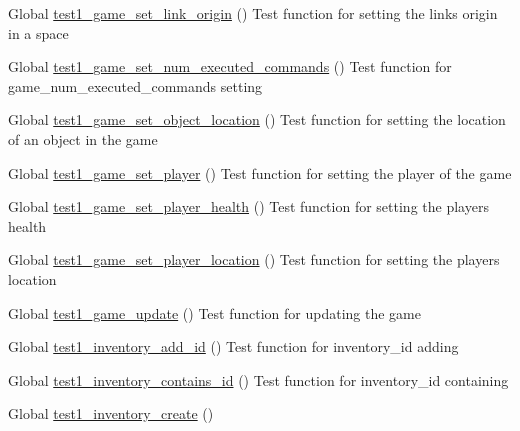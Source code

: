 \begin{DoxyRefList}
\item[Global \mbox{\hyperlink{game__test_8c_a87a7d534c6ea81e0db3296f678fe770a}{test1\+\_\+game\+\_\+set\+\_\+link\+\_\+origin}} ()]\label{test__test000243}%
%
Test function for setting the link\textquotesingle{}s origin in a space  
\item[Global \mbox{\hyperlink{game__test_8c_a130b1332ea3733268fb6ae18bdcbc5ac}{test1\+\_\+game\+\_\+set\+\_\+num\+\_\+executed\+\_\+commands}} ()]\label{test__test000276}%
%
Test function for game\+\_\+num\+\_\+executed\+\_\+commands setting  
\item[Global \mbox{\hyperlink{game__test_8c_a467fe2bad25b7d53fa51ad3901f4672f}{test1\+\_\+game\+\_\+set\+\_\+object\+\_\+location}} ()]\label{test__test000206}%
%
Test function for setting the location of an object in the game  
\item[Global \mbox{\hyperlink{game__test_8c_a2bc38fca795c42215043a239f722309a}{test1\+\_\+game\+\_\+set\+\_\+player}} ()]\label{test__test000153}%
%
Test function for setting the player of the game  
\item[Global \mbox{\hyperlink{game__test_8c_a03692a2a855f9e6fc5da753f525affd0}{test1\+\_\+game\+\_\+set\+\_\+player\+\_\+health}} ()]\label{test__test000167}%
%
Test function for setting the player\textquotesingle{}s health  
\item[Global \mbox{\hyperlink{game__test_8c_a11eedf3d88f649f9f208861d318f893d}{test1\+\_\+game\+\_\+set\+\_\+player\+\_\+location}} ()]\label{test__test000162}%
%
Test function for setting the player\textquotesingle{}s location  
\item[Global \mbox{\hyperlink{game__test_8c_acef689d23c451c738aab116984001501}{test1\+\_\+game\+\_\+update}} ()]\label{test__test000143}%
%
Test function for updating the game  
\item[Global \mbox{\hyperlink{inventory__test_8c_a40a21fc4411716ecfa2bbb33c783df94}{test1\+\_\+inventory\+\_\+add\+\_\+id}} ()]\label{test__test000418}%
%
Test function for inventory\+\_\+id adding  
\item[Global \mbox{\hyperlink{inventory__test_8c_ada5e84bfbe0200056b8c30f07a25385b}{test1\+\_\+inventory\+\_\+contains\+\_\+id}} ()]\label{test__test000430}%
%
Test function for inventory\+\_\+id containing  
\item[Global \mbox{\hyperlink{inventory__test_8c_a33638f1a88ae16ab8d6bee00145b82b8}{test1\+\_\+inventory\+\_\+create}} ()]\label{test__test000414}%

\end{DoxyRefList}
